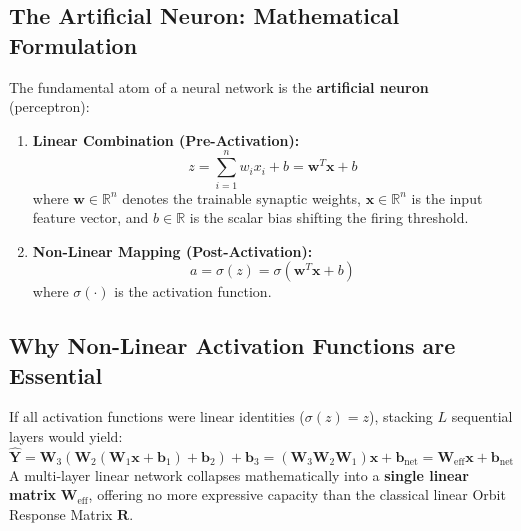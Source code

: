 \documentclass[11pt,a4paper]{article}
\begin{document}
\subsection{The Artificial Neuron: Mathematical Formulation}
The fundamental atom of a neural network is the \textbf{artificial neuron} (perceptron):
\begin{enumerate}
    \item \textbf{Linear Combination (Pre-Activation):}
    \begin{equation}
        z = \sum_{i=1}^n w_i x_i + b = \mathbf{w}^T \mathbf{x} + b
    \end{equation}
    where $\mathbf{w} \in \mathbb{R}^n$ denotes the trainable synaptic weights, $\mathbf{x} \in \mathbb{R}^n$ is the input feature vector, and $b \in \mathbb{R}$ is the scalar bias shifting the firing threshold.
    
    \item \textbf{Non-Linear Mapping (Post-Activation):}
    \begin{equation}
        a = \sigma(z) = \sigma(\mathbf{w}^T \mathbf{x} + b)
    \end{equation}
    where $\sigma(\cdot)$ is the activation function.
\end{enumerate}

\subsection{Why Non-Linear Activation Functions are Essential}
\begin{infobox}
If all activation functions were linear identities ($\sigma(z) = z$), stacking $L$ sequential layers would yield:
\begin{equation}
    \hat{\mathbf{Y}} = \mathbf{W}_3 (\mathbf{W}_2 (\mathbf{W}_1 \mathbf{x} + \mathbf{b}_1) + \mathbf{b}_2) + \mathbf{b}_3 = (\mathbf{W}_3 \mathbf{W}_2 \mathbf{W}_1) \mathbf{x} + \mathbf{b}_{\text{net}} = \mathbf{W}_{\text{eff}} \mathbf{x} + \mathbf{b}_{\text{net}}
\end{equation}
A multi-layer linear network collapses mathematically into a \textbf{single linear matrix} $\mathbf{W}_{\text{eff}}$, offering no more expressive capacity than the classical linear Orbit Response Matrix $\mathbf{R}$.
\end{infobox}
\end{document}
